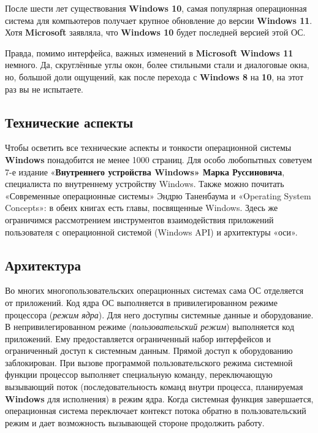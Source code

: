 \documentclass[14pt, a4paper]{article}
\begin{document}
После шести лет существования \textbf{Windows 10}, самая популярная операционная система для компьютеров
получает крупное обновление до версии \textbf{Windows 11}. Хотя \textbf{Microsoft} заявляла,
что \textbf{Windows 10} будет последней версией этой ОС.


Правда, помимо интерфейса, важных изменений в \textbf{Microsoft Windows 11} немного. Да,
скруглённые углы окон, более стильными стали и диалоговые окна, но, большой доли ощущений,
как после перехода с \textbf{Windows 8} на \textbf{10}, на этот раз вы не испытаете. \newpage




\begin{center}
    \section*{Технические аспекты}
\end{center}

Чтобы осветить все технические аспекты и тонкости операционной системы \textbf{Windows} понадобится не менее
1000 страниц. Для особо любопытных советуем 7-е издание «\textbf{Внутреннего устройства Windows» Марка Руссиновича},
специалиста по внутреннему устройству Windows. Также можно почитать «Современные операционные системы»
Эндрю Таненбаума и «Operating System Concepts»: в обеих книгах есть главы, посвященные Windows.
Здесь же ограничимся рассмотрением инструментов взаимодействия приложений пользователя с операционной
системой (Windows API) и архитектуры «оси». \\


\begin{centering}
    \subsection*{Архитектура}
\end{centering}

Во многих многопользовательских операционных системах сама ОС отделяется от приложений.
Код ядра ОС выполняется в привилегированном режиме процессора (\textit{режим ядра}).
Для него доступны системные данные и оборудование. В непривилегированном режиме
(\textit{пользовательский режим}) выполняется код приложений. Ему предоставляется ограниченный набор
интерфейсов и ограниченный доступ к системным данным. Прямой доступ к оборудованию заблокирован.
При вызове программой пользовательского режима системной функции процессор выполняет специальную команду,
переключающую вызывающий поток (последовательность команд внутри процесса, планируемая \textbf{Windows} для исполнения)
в режим ядра. Когда системная функция завершается, операционная система переключает контекст
потока обратно в пользовательский режим и дает возможность вызывающей стороне продолжить работу.
\end{document}
